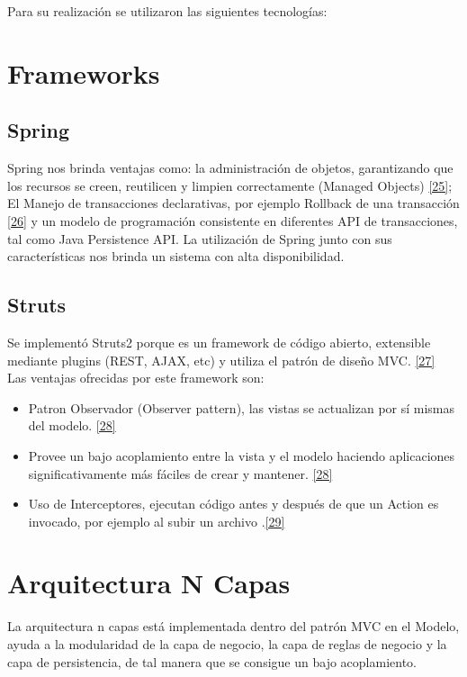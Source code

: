 Para su realización se utilizaron las siguientes tecnologías:

\section{Frameworks}
\subsection {Spring}
Spring nos brinda ventajas como: la administración de objetos, garantizando que los recursos se creen, reutilicen y limpien correctamente (Managed Objects) \hyperlink{b25}{[25]}; El Manejo de transacciones declarativas, por ejemplo Rollback de una transacción \hyperlink{b26}{[26]} y un modelo de programación consistente en diferentes API de transacciones, tal como Java Persistence API.
La utilización de Spring junto con sus características nos brinda un sistema con alta disponibilidad.

\subsection {Struts}
Se implementó Struts2 porque es un framework de código abierto, extensible mediante plugins (REST, AJAX, etc) y utiliza el patrón de diseño MVC. \hyperlink{b27}{[27]} \\ 
Las ventajas ofrecidas por este framework son: 

\begin{itemize}
	\item Patron Observador (Observer pattern), las vistas se actualizan por sí mismas del modelo. \hyperlink{b28}{[28]}
	\item Provee un bajo acoplamiento entre la vista y el modelo haciendo aplicaciones significativamente más fáciles de crear y mantener. \hyperlink{b28}{[28]}
	\item Uso de Interceptores, ejecutan código antes y después de que un Action es invocado, por ejemplo al subir un archivo .\hyperlink{b29}{[29]}
\end{itemize}

\section{Arquitectura N Capas}
La arquitectura n capas está implementada dentro del patrón MVC en el Modelo, ayuda a la modularidad de la capa de negocio, la capa de reglas de negocio y la capa de persistencia, de tal manera que se consigue un bajo acoplamiento.


